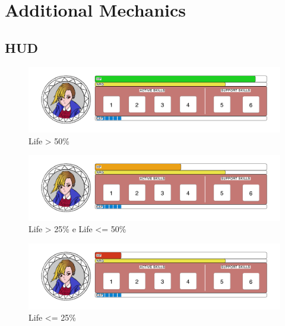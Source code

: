 \section{Additional Mechanics}

\subsection{HUD}

\begin{figure}[H]
	\centering
	\includegraphics[width=14cm]{images/hud/HUD_life_green.png}
	\caption*{Life > 50\%}
\end{figure}

\begin{figure}[H]
	\centering
	\includegraphics[width=14cm]{images/hud/HUD_life_orange.png}
	\caption*{Life > 25\% e Life <= 50\%}
\end{figure}

\begin{figure}[H]
	\centering
	\includegraphics[width=14cm]{images/hud/HUD_life_red.png}
	\caption*{Life <= 25\%}
\end{figure}